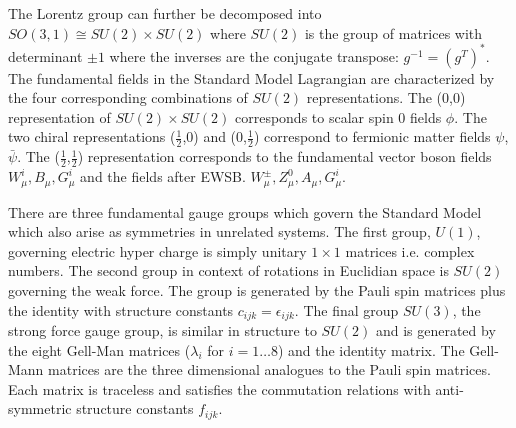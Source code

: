 The Lorentz group can further be decomposed into  $SO(3,1) \cong SU(2) \times SU(2)$
where $SU(2)$ is the group of matrices with determinant $\pm 1$ where the inverses are
 the conjugate transpose: $g^{-1} = (g^{T})^*$. The fundamental fields in the Standard Model
Lagrangian are characterized by the four corresponding combinations of $SU(2)$ representations. The (0,0) representation 
of $SU(2) \times SU(2)$ corresponds to scalar spin 0 fields $\phi$. The two chiral representations
 ($\frac{1}{2}$,0) and (0,$\frac{1}{2}$) correspond to fermionic matter fields $\psi$,$\bar{\psi}$. 
The ($\frac{1}{2}$,$\frac{1}{2}$) representation corresponds to the fundamental vector 
boson fields $W^i_\mu, B_\mu, G^i_\mu$ and the fields after
 EWSB. $W^{\pm}_\mu, Z^0_\mu, A_\mu, G^i_\mu$. 

There are three fundamental gauge groups which govern the Standard Model which also arise as symmetries in unrelated systems.
The first group, $U(1)$, governing electric hyper charge is simply unitary $1\times 1$ matrices i.e. complex numbers. The
second group in context of rotations in Euclidian space is $SU(2)$ governing the weak force. The group is generated
by the Pauli spin matrices plus the identity with structure constants $c_{ijk} = \epsilon_{ijk}$. 
The final group $SU(3)$, the strong force gauge group, is similar in structure to $SU(2)$ and is generated
by the eight Gell-Man matrices ($\lambda_i$ for $i=1\ldots 8$) and the identity matrix.  The Gell-Mann matrices
are the three dimensional analogues to the Pauli spin matrices. Each matrix is traceless and satisfies the  
commutation relations with anti-symmetric structure constants $f_{ijk}$. 

